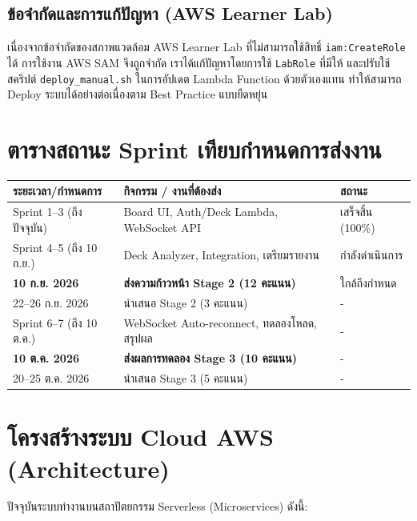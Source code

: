 \documentclass[12pt,a4paper]{article}
\begin{document}
\subsection{ข้อจำกัดและการแก้ปัญหา (AWS Learner Lab)}

เนื่องจากข้อจำกัดของสภาพแวดล้อม AWS Learner Lab ที่ไม่สามารถใช้สิทธิ์ \texttt{iam:CreateRole} ได้ การใช้งาน AWS SAM จึงถูกจำกัด เราได้แก้ปัญหาโดยการใช้ \texttt{LabRole} ที่มีให้ และปรับใช้สคริปต์ \texttt{deploy\_manual.sh} ในการอัปเดต Lambda Function ด้วยตัวเองแทน ทำให้สามารถ Deploy ระบบได้อย่างต่อเนื่องตาม Best Practice แบบยืดหยุ่น

\section{ตารางสถานะ Sprint เทียบกำหนดการส่งงาน}

\begin{table}[h!]
\centering
\small
\begin{tabular}{p{4.5cm} p{6cm} p{3.5cm}}
\toprule
\textbf{ระยะเวลา/กำหนดการ} & \textbf{กิจกรรม / งานที่ต้องส่ง} & \textbf{สถานะ} \\
\midrule
Sprint 1--3 (ถึงปัจจุบัน) & Board UI, Auth/Deck Lambda, WebSocket API & เสร็จสิ้น (100\%) \\
Sprint 4--5 (ถึง 10 ก.ย.) & Deck Analyzer, Integration, เตรียมรายงาน & กำลังดำเนินการ \\
\textbf{10 ก.ย. 2026} & \textbf{ส่งความก้าวหน้า Stage 2 (12 คะแนน)} & ใกล้ถึงกำหนด \\
22--26 ก.ย. 2026 & นำเสนอ Stage 2 (3 คะแนน) & - \\
Sprint 6--7 (ถึง 10 ต.ค.) & WebSocket Auto-reconnect, ทดลองโหลด, สรุปผล & - \\
\textbf{10 ต.ค. 2026} & \textbf{ส่งผลการทดลอง Stage 3 (10 คะแนน)} & - \\
20--25 ต.ค. 2026 & นำเสนอ Stage 3 (5 คะแนน) & - \\
\bottomrule
\end{tabular}
\end{table}

\section{โครงสร้างระบบ Cloud AWS (Architecture)}

ปัจจุบันระบบทำงานบนสถาปัตยกรรม Serverless (Microservices) ดังนี้:
\end{document}
